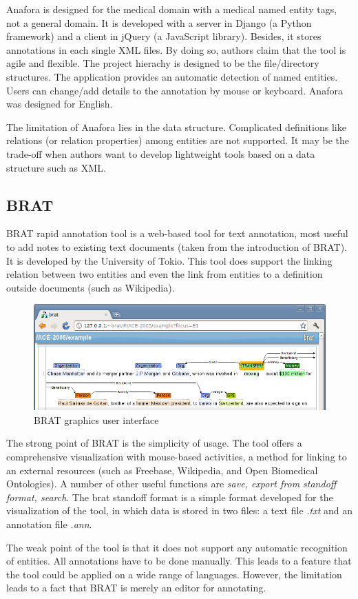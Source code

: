 Anafora is designed for the medical domain with a medical named entity tags, not a general domain.
It is developed with a server in Django (a Python framework) and a client in jQuery (a JavaScript library).
Besides, it stores annotations in each single XML files.
By doing so, authors claim that the tool is agile and flexible.
The project hierachy is designed to be the file/directory structures.
The application provides an automatic detection of named entities.
Users can change/add details to the annotation by mouse or keyboard.
Anafora was designed for English.

The limitation of Anafora lies in the data structure.
Complicated definitions like relations (or relation properties) among entities
are not supported. It may be the trade-off when authors want to develop lightweight
tools based on a data structure such as XML.

\subsection{BRAT}

BRAT rapid annotation tool is a web-based tool for text annotation,
most useful to add notes to existing text documents (taken from the introduction of BRAT).
It is developed by the University of Tokio.
This tool does support the linking relation between two entities and even the link from entities to a definition outside documents (such as Wikipedia).

\begin{figure}[!htb]
	\centering
	\includegraphics[width=\textwidth]{Images/brat}
	\caption{BRAT graphics user interface}
	\label{fig:Second}
\end{figure}

The strong point of BRAT is the simplicity of usage.
The tool offers a comprehensive visualization with mouse-based activities,
a method for linking to an external resources (such as Freebase, Wikipedia, and Open Biomedical Ontologies).
A number of other useful functions are \textit{save, export from standoff format, search}.
The brat  standoff format is a simple format developed for the visualization of the tool,
in which data is stored in two files: a text file \textit{.txt} and an annotation file \textit{.ann}.

The weak point of the tool is that it does not support any automatic recognition of entities.
All annotations have to be done manually.
This leads to a feature that the tool could be applied on a wide range of languages.
However, the limitation leads to a fact that BRAT is merely an editor for annotating.
